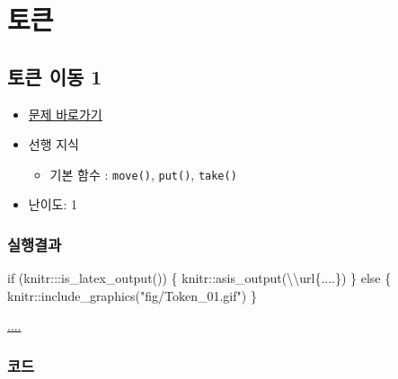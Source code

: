 \documentclass[
  b5paperpaper,
  DIV=11,
  numbers=noendperiod]{scrreprt}
\newenvironment{Shaded}{\begin{snugshade}}{\end{snugshade}}
\newcommand{\ControlFlowTok}[1]{\textcolor[rgb]{0.00,0.23,0.31}{#1}}
\newcommand{\FunctionTok}[1]{\textcolor[rgb]{0.28,0.35,0.67}{#1}}
\newcommand{\NormalTok}[1]{\textcolor[rgb]{0.00,0.23,0.31}{#1}}
\newcommand{\SpecialCharTok}[1]{\textcolor[rgb]{0.37,0.37,0.37}{#1}}
\newcommand{\StringTok}[1]{\textcolor[rgb]{0.13,0.47,0.30}{#1}}
\providecommand{\tightlist}{%
  \setlength{\itemsep}{0pt}\setlength{\parskip}{0pt}}\usepackage{longtable,booktabs,array}
\begin{document}
\hypertarget{rain}{%
\chapter{토큰}\label{rain}}

\hypertarget{token-01}{%
\section{토큰 이동 1}\label{token-01}}

\begin{itemize}
\tightlist
\item
  \href{https://reeborg.ca/reeborg.html?lang=ko-en\&mode=python\&menu=worlds\%2Fmenus\%2Freeborg_intro_en.json\&name=Tokens\%201\&url=worlds\%2Ftutorial_en\%2Ftokens1.json}{문제
  바로가기}
\item
  선행 지식

  \begin{itemize}
  \tightlist
  \item
    기본 함수 : \texttt{move()}, \texttt{put()}, \texttt{take()}
  \end{itemize}
\item
  난이도: 1
\end{itemize}

\hypertarget{uxc2e4uxd589uxacb0uxacfc-15}{%
\subsection{실행결과}\label{uxc2e4uxd589uxacb0uxacfc-15}}

\begin{Shaded}
\begin{Highlighting}[]
\ControlFlowTok{if}\NormalTok{ (knitr}\SpecialCharTok{:::}\FunctionTok{is\_latex\_output}\NormalTok{()) \{}
\NormalTok{  knitr}\SpecialCharTok{::}\FunctionTok{asis\_output}\NormalTok{(}\StringTok{\textquotesingle{}}\SpecialCharTok{\textbackslash{}\textbackslash{}}\StringTok{url\{....\}\textquotesingle{}}\NormalTok{)}
\NormalTok{\} }\ControlFlowTok{else}\NormalTok{ \{}
\NormalTok{  knitr}\SpecialCharTok{::}\FunctionTok{include\_graphics}\NormalTok{(}\StringTok{"fig/Token\_01.gif"}\NormalTok{)}
\NormalTok{\}}
\end{Highlighting}
\end{Shaded}

\url{....}

\hypertarget{uxcf54uxb4dc-15}{%
\subsection{코드}\label{uxcf54uxb4dc-15}}
\end{document}
